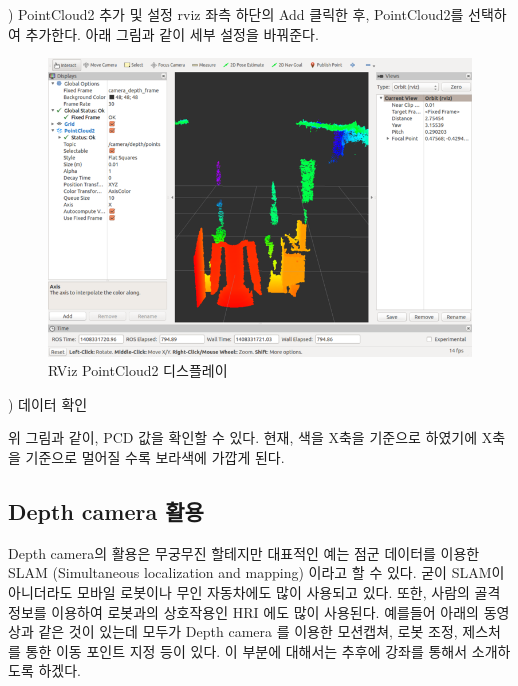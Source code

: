 \vspace{\baselineskip}
\noindent
{}) PointCloud2 추가 및 설정
rviz 좌측 하단의 Add 클릭한 후, PointCloud2를 선택하여 추가한다. 아래 그림과 같이 세부 설정을 바꿔준다.

\begin{figure}[h]
\centering\includegraphics[width=0.9\columnwidth]{pictures/chapter9/rviz_pc2.png}
\caption{RViz PointCloud2 디스플레이}
\end{figure}

\vspace{\baselineskip}
\noindent
{}
\thenum) 데이터 확인

위 그림과 같이, PCD 값을 확인할 수 있다. 현재, 색을 X축을 기준으로 하였기에 X축을 기준으로 멀어질 수록 보라색에 가깝게 된다.

\subsection{Depth camera 활용}

Depth camera의 활용은 무궁무진 할테지만 대표적인 예는 점군 데이터를 이용한 SLAM (Simultaneous localization and mapping) 이라고 할 수 있다. 굳이 SLAM이 아니더라도 모바일 로봇이나 무인 자동차에도 많이 사용되고 있다. 또한, 사람의 골격 정보를 이용하여 로봇과의 상호작용인 HRI 에도 많이 사용된다. 예를들어 아래의 동영상과 같은 것이 있는데 모두가 Depth camera 를 이용한 모션캡쳐, 로봇 조정, 제스처를 통한 이동 포인트 지정 등이 있다. 이 부분에 대해서는 추후에 강좌를 통해서 소개하도록 하겠다.






